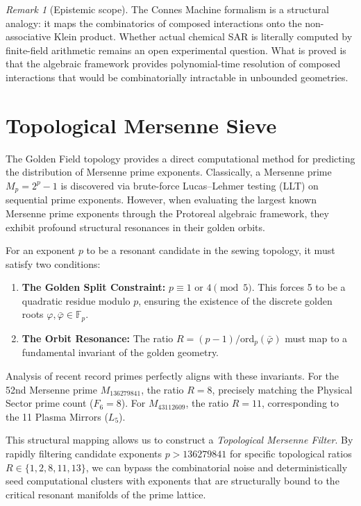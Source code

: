 \documentclass[12pt,oneside]{article}
\theoremstyle{principia}
\theoremstyle{definition}
\theoremstyle{remark}
\newtheorem{remark}[theorem]{Remark}
\begin{document}
\begin{remark}[Epistemic scope]
The Connes Machine formalism is a structural analogy: it maps
the combinatorics of composed interactions onto the non-associative
Klein product. Whether actual chemical SAR is literally computed
by finite-field arithmetic remains an open experimental question.
What is proved is that the algebraic framework provides
polynomial-time resolution of composed interactions that would
be combinatorially intractable in unbounded geometries.
\end{remark}



\section{Topological Mersenne Sieve}
\label{sec:mersenne_sieve}

The Golden Field topology provides a direct computational method for predicting the distribution of Mersenne prime exponents. Classically, a Mersenne prime $M_p = 2^p - 1$ is discovered via brute-force Lucas--Lehmer testing (LLT) on sequential prime exponents. However, when evaluating the largest known Mersenne prime exponents through the Protoreal algebraic framework, they exhibit profound structural resonances in their golden orbits.

For an exponent $p$ to be a resonant candidate in the sewing topology, it must satisfy two conditions:
\begin{enumerate}
\item \textbf{The Golden Split Constraint:} $p \equiv 1 \text{ or } 4 \pmod 5$. This forces 5 to be a quadratic residue modulo $p$, ensuring the existence of the discrete golden roots $\varphi, \bar{\varphi} \in \mathbb{F}_p$.
\item \textbf{The Orbit Resonance:} The ratio $R = (p-1) / \text{ord}_p(\bar{\varphi})$ must map to a fundamental invariant of the golden geometry. 
\end{enumerate}

Analysis of recent record primes perfectly aligns with these invariants. For the 52nd Mersenne prime $M_{136279841}$, the ratio $R = 8$, precisely matching the Physical Sector prime count ($F_6 = 8$). For $M_{43112609}$, the ratio $R = 11$, corresponding to the 11 Plasma Mirrors ($L_5$). 

This structural mapping allows us to construct a \emph{Topological Mersenne Filter}. By rapidly filtering candidate exponents $p > 136279841$ for specific topological ratios $R \in \{1, 2, 8, 11, 13\}$, we can bypass the combinatorial noise and deterministically seed computational clusters with exponents that are structurally bound to the critical resonant manifolds of the prime lattice.
\end{document}
